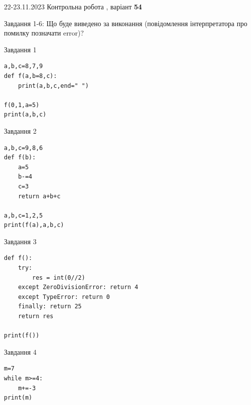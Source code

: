 \documentclass[12pt, ukrainian]{article}
\begin{document}
{{22-23.11.2023 Контрольна робота , варіант  \No \textbf { 54 }\par}}
{

Завдання 1-6: Що буде виведено за виконання (повідомлення інтерпретатора про помилку позначати error)?


\begin{minipage}[t]{9.7cm}                
{\begin{center}Завдання {1}\end{center}}
\begin{verbatim}
a,b,c=8,7,9
def f(a,b=8,c):
    print(a,b,c,end=" ")

f(0,1,a=5)
print(a,b,c)
\end{verbatim}     
\end{minipage}
\vline \hspace{8mm}
\begin{minipage}[t]{8.0cm}                
{\begin{center}Завдання {2}\end{center}}
\begin{verbatim}
a,b,c=9,8,6
def f(b):
    a=5
    b-=4
    c=3
    return a+b+c

a,b,c=1,2,5
print(f(a),a,b,c)
\end{verbatim}     
\end{minipage}

\vspace{15mm}
\begin{minipage}[t]{9.7cm}                
{\begin{center}Завдання {3}\end{center}}
\begin{verbatim}
def f():
    try:
        res = int(0//2)
    except ZeroDivisionError: return 4
    except TypeError: return 0
    finally: return 25
    return res

print(f())
\end{verbatim}     
\end{minipage}
\vline \hspace{8mm}
\begin{minipage}[t]{8.0cm}                
{\begin{center}Завдання {4}\end{center}}
\begin{verbatim}
m=7
while m>=4:
    m+=-3
print(m)
\end{verbatim}     
\end{minipage}

}
\end{document}
